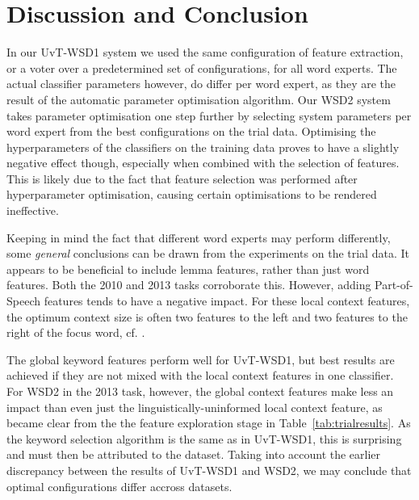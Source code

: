\section{Discussion and Conclusion}




In our UvT-WSD1 system we used the same configuration of feature extraction,
or a voter over a predetermined set of configurations, for all word experts. The actual
classifier parameters however, do differ per word expert, as they are the
result of the automatic parameter optimisation algorithm. Our WSD2 system
takes parameter optimisation one step further by selecting system parameters
per word expert from the best configurations on the trial data. Optimising the
hyperparameters of the classifiers on the training data proves to have a
slightly negative effect though, especially when combined with the selection of
features. This is likely due to the fact that feature selection was performed
after hyperparameter optimisation, causing certain optimisations to be rendered
ineffective.

Keeping in mind the fact that different word experts may perform differently,
some \emph{general} conclusions can be drawn from the experiments on the trial
data. It appears to be beneficial to include lemma features, rather than just
word features. Both the 2010 and 2013 tasks corroborate this. However, adding
Part-of-Speech features tends to have a negative impact. For these local
context features, the optimum context size is often two features to the left
and two features to the right of the focus word, cf.  \cite{Hendrickx+02}.

The global keyword features perform well for UvT-WSD1, but best results are
achieved if they are not mixed with the local context features in one
classifier. For WSD2 in the 2013 task, however, the global context features
make less an impact than even just the linguistically-uninformed local context
feature, as became clear from the the feature exploration stage in
Table~\ref{tab:trialresults}. As the keyword selection algorithm is the same
as in UvT-WSD1, this is surprising and must then be attributed to the dataset.
Taking into account the earlier discrepancy between the results of UvT-WSD1 and
WSD2, we may conclude that optimal configurations differ accross datasets.

